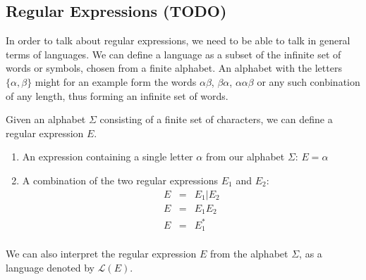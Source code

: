 \documentclass[12pt]{article}
\theoremstyle{definition}
\begin{document}
\subsection{Regular Expressions (TODO)}

In order to talk about regular expressions, we need to be able to talk in general terms of languages. We can define a language as a subset of the infinite set of words or symbols, chosen from a finite alphabet. An alphabet with the letters $\{\alpha, \beta\}$ might for an example form the words $\alpha\beta$, $\beta\alpha$, $\alpha\alpha\beta$ or any such conbination of any length, thus forming an infinite set of words.\\

\begin{definition} Given an alphabet $\Sigma$ consisting of a finite set of characters, we can define a regular expression $E$.
	\begin{enumerate}
		\item An expression containing a single letter $\alpha$ from our alphabet $\Sigma$: $E = \alpha$
		
		\item A combination of the two regular expressions $E_1$ and $E_2$:
		\begin{eqnarray}
			E &=& E_1 | E_2 \\
			E &=& E_1E_2 \\
			E &=& E_1^* \\
		\end{eqnarray}
	\end{enumerate}	
\end{definition} 

We can also interpret the regular expression $E$ from the alphabet $\Sigma$, as a language denoted by $\mathcal{L}(E)$. \\
\end{document}
